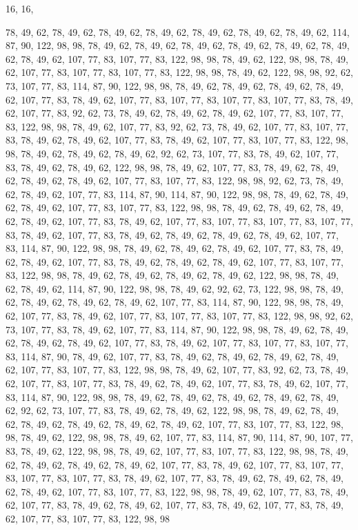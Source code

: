 16, 16,

78, 49, 62, 78, 49, 62, 78, 49, 62, 78, 49, 62, 78, 49, 62, 78,
49, 62, 78, 49, 62, 114, 87, 90, 122, 98, 98, 78, 49, 62, 78, 49,
62, 78, 49, 62, 78, 49, 62, 78, 49, 62, 78, 49, 62, 78, 49, 62,
107, 77, 83, 107, 77, 83, 122, 98, 98, 78, 49, 62, 122, 98, 98, 78,
49, 62, 107, 77, 83, 107, 77, 83, 107, 77, 83, 122, 98, 98, 78, 49,
62, 122, 98, 98, 92, 62, 73, 107, 77, 83, 114, 87, 90, 122, 98, 98,
78, 49, 62, 78, 49, 62, 78, 49, 62, 78, 49, 62, 107, 77, 83, 78,
49, 62, 107, 77, 83, 107, 77, 83, 107, 77, 83, 107, 77, 83, 78, 49,
62, 107, 77, 83, 92, 62, 73, 78, 49, 62, 78, 49, 62, 78, 49, 62,
107, 77, 83, 107, 77, 83, 122, 98, 98, 78, 49, 62, 107, 77, 83, 92,
62, 73, 78, 49, 62, 107, 77, 83, 107, 77, 83, 78, 49, 62, 78, 49,
62, 107, 77, 83, 78, 49, 62, 107, 77, 83, 107, 77, 83, 122, 98, 98,
78, 49, 62, 78, 49, 62, 78, 49, 62, 92, 62, 73, 107, 77, 83, 78,
49, 62, 107, 77, 83, 78, 49, 62, 78, 49, 62, 122, 98, 98, 78, 49,
62, 107, 77, 83, 78, 49, 62, 78, 49, 62, 78, 49, 62, 78, 49, 62,
107, 77, 83, 107, 77, 83, 122, 98, 98, 92, 62, 73, 78, 49, 62, 78,
49, 62, 107, 77, 83, 114, 87, 90, 114, 87, 90, 122, 98, 98, 78, 49,
62, 78, 49, 62, 78, 49, 62, 107, 77, 83, 107, 77, 83, 122, 98, 98,
78, 49, 62, 78, 49, 62, 78, 49, 62, 78, 49, 62, 107, 77, 83, 78,
49, 62, 107, 77, 83, 107, 77, 83, 107, 77, 83, 107, 77, 83, 78, 49,
62, 107, 77, 83, 78, 49, 62, 78, 49, 62, 78, 49, 62, 78, 49, 62,
107, 77, 83, 114, 87, 90, 122, 98, 98, 78, 49, 62, 78, 49, 62, 78,
49, 62, 107, 77, 83, 78, 49, 62, 78, 49, 62, 107, 77, 83, 78, 49,
62, 78, 49, 62, 78, 49, 62, 107, 77, 83, 107, 77, 83, 122, 98, 98,
78, 49, 62, 78, 49, 62, 78, 49, 62, 78, 49, 62, 122, 98, 98, 78,
49, 62, 78, 49, 62, 114, 87, 90, 122, 98, 98, 78, 49, 62, 92, 62,
73, 122, 98, 98, 78, 49, 62, 78, 49, 62, 78, 49, 62, 78, 49, 62,
107, 77, 83, 114, 87, 90, 122, 98, 98, 78, 49, 62, 107, 77, 83, 78,
49, 62, 107, 77, 83, 107, 77, 83, 107, 77, 83, 122, 98, 98, 92, 62,
73, 107, 77, 83, 78, 49, 62, 107, 77, 83, 114, 87, 90, 122, 98, 98,
78, 49, 62, 78, 49, 62, 78, 49, 62, 78, 49, 62, 107, 77, 83, 78,
49, 62, 107, 77, 83, 107, 77, 83, 107, 77, 83, 114, 87, 90, 78, 49,
62, 107, 77, 83, 78, 49, 62, 78, 49, 62, 78, 49, 62, 78, 49, 62,
107, 77, 83, 107, 77, 83, 122, 98, 98, 78, 49, 62, 107, 77, 83, 92,
62, 73, 78, 49, 62, 107, 77, 83, 107, 77, 83, 78, 49, 62, 78, 49,
62, 107, 77, 83, 78, 49, 62, 107, 77, 83, 114, 87, 90, 122, 98, 98,
78, 49, 62, 78, 49, 62, 78, 49, 62, 78, 49, 62, 78, 49, 62, 92,
62, 73, 107, 77, 83, 78, 49, 62, 78, 49, 62, 122, 98, 98, 78, 49,
62, 78, 49, 62, 78, 49, 62, 78, 49, 62, 78, 49, 62, 78, 49, 62,
107, 77, 83, 107, 77, 83, 122, 98, 98, 78, 49, 62, 122, 98, 98, 78,
49, 62, 107, 77, 83, 114, 87, 90, 114, 87, 90, 107, 77, 83, 78, 49,
62, 122, 98, 98, 78, 49, 62, 107, 77, 83, 107, 77, 83, 122, 98, 98,
78, 49, 62, 78, 49, 62, 78, 49, 62, 78, 49, 62, 107, 77, 83, 78,
49, 62, 107, 77, 83, 107, 77, 83, 107, 77, 83, 107, 77, 83, 78, 49,
62, 107, 77, 83, 78, 49, 62, 78, 49, 62, 78, 49, 62, 78, 49, 62,
107, 77, 83, 107, 77, 83, 122, 98, 98, 78, 49, 62, 107, 77, 83, 78,
49, 62, 107, 77, 83, 78, 49, 62, 78, 49, 62, 107, 77, 83, 78, 49,
62, 107, 77, 83, 78, 49, 62, 107, 77, 83, 107, 77, 83, 122, 98, 98
